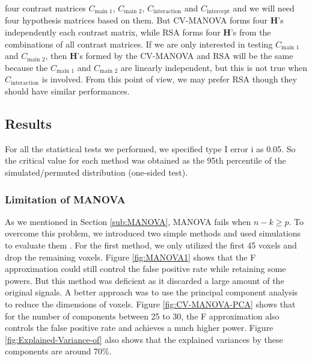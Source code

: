 four contrast matrices $C_{\text{main 1}}$, $C_{\text{main 2}}$,
$C_{\text{interaction}}$ and $C_{\text{intercept}}$ and we will
need four hypothesis matrices based on them. But CV-MANOVA forms four
$\boldsymbol{H}$'s independently each contrast matrix, while RSA
forms four $\boldsymbol{H}$'s from the combinations of all contrast
matrices. If we are only interested in testing $C_{\text{main 1}}$
and $C_{\text{main 2}}$, then $\boldsymbol{H}$'s formed by the CV-MANOVA
and RSA will be the same because the $C_{\text{main 1}}$ and $C_{\text{main 2}}$
are linearly independent, but this is not true when $C_{\text{interaction}}$
is involved. From this point of view, we may prefer RSA though they
should have similar performances.


\subsection{Results}

For all the statistical tests we performed, we specified type I error
i as 0.05. So the critical value for each method was obtained as the
95th percentile of the simulated/permuted distribution (one-sided
test).


\subsubsection{Limitation of MANOVA}

As we mentioned in Section \ref{sub:MANOVA}, MANOVA fails when $n-k\ge p$.
To overcome this problem, we introduced two simple methods and used
simulations to evaluate them . For the first method, we only utilized
the first 45 voxels and drop the remaining voxels. Figure \ref{fig:MANOVA1}
shows that the F approximation could still control the false positive
rate while retaining some powers. But this method was deficient as
it discarded a large amount of the original signals. A better approach
was to use the principal component analysis to reduce the dimensions
of voxels. Figure \ref{fig:CV-MANOVA-PCA} shows that for the number
of components between 25 to 30, the F approximation also controls
the false positive rate and achieves a much higher power. Figure \ref{fig:Explained-Variance-of}
also shows that the explained variances by these components are around
$70\%$.

